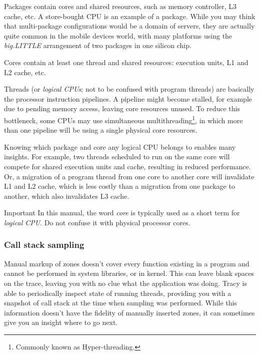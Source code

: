 \documentclass[hidelinks,titlepage,a4paper]{article}
\begin{document}
Packages contain cores and shared resources, such as memory controller, L3 cache, etc. A store-bought CPU is an example of a package. While you may think that multi-package configurations would be a domain of servers, they are actually quite common in the mobile devices world, with many platforms using the \emph{big.LITTLE} arrangement of two packages in one silicon chip.

Cores contain at least one thread and shared resources: execution units, L1 and L2 cache, etc.

Threads (or \emph{logical CPUs}; not to be confused with program threads) are basically the processor instruction pipelines. A pipeline might become stalled, for example due to pending memory access, leaving core resources unused. To reduce this bottleneck, some CPUs may use simultaneous multithreading\footnote{Commonly known as Hyper-threading.}, in which more than one pipeline will be using a single physical core resources.

Knowing which package and core any logical CPU belongs to enables many insights. For example, two threads scheduled to run on the same core will compete for shared execution units and cache, resulting in reduced performance. Or, a migration of a program thread from one core to another core will invalidate L1 and L2 cache, which is less costly than a migration from one package to another, which also invalidates L3 cache.

\begin{bclogo}[
noborder=true,
couleur=black!5,
logo=\bcbombe
]{Important}
In this manual, the word \emph{core} is typically used as a short term for \emph{logical CPU}. Do not confuse it with physical processor cores.
\end{bclogo}

\subsubsection{Call stack sampling}
\label{sampling}

Manual markup of zones doesn't cover every function existing in a program and cannot be performed in system libraries, or in kernel. This can leave blank spaces on the trace, leaving you with no clue what the application was doing. Tracy is able to periodically inspect state of running threads, providing you with a snapshot of call stack at the time when sampling was performed. While this information doesn't have the fidelity of manually inserted zones, it can sometimes give you an insight where to go next.
\end{document}

